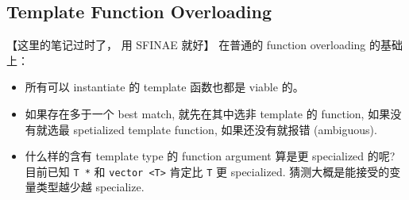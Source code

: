 \subsection{Template Function Overloading}
【这里的笔记过时了， 用 SFINAE 就好】
在普通的 function overloading 的基础上：
\begin{itemize}
\item 所有可以 instantiate 的 template 函数也都是 viable 的。
\item 如果存在多于一个 best match, 就先在其中选非 template 的 function, 如果没有就选最 spetialized template function, 如果还没有就报错 (ambiguous).
\item 什么样的含有 template type 的 function argument 算是更 specialized 的呢? 目前已知 \verb|T *| 和 \verb|vector <T>| 肯定比 \verb`T` 更 specialized. 猜测大概是能接受的变量类型越少越 specialize.
\end{itemize}

